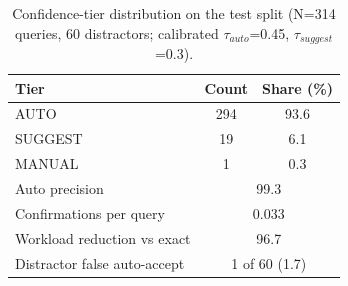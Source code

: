 \begin{table}[t]
\caption{Confidence-tier distribution on the test split (N=314 queries, 60 distractors; calibrated $\tau_{auto}$=0.45, $\tau_{suggest}$=0.3).}
\label{tab:tiers}
\centering
\footnotesize
\setlength{\tabcolsep}{3.5pt}
\begin{tabular}{lcc}
\toprule
Tier & Count & Share (\%) \\
\midrule
AUTO & 294 & 93.6 \\
SUGGEST & 19 & 6.1 \\
MANUAL & 1 & 0.3 \\
\midrule
Auto precision & \multicolumn{2}{c}{99.3} \\
Confirmations per query & \multicolumn{2}{c}{0.033} \\
Workload reduction vs exact & \multicolumn{2}{c}{96.7} \\
Distractor false auto-accept & \multicolumn{2}{c}{1 of 60 (1.7)} \\
\bottomrule
\end{tabular}
\end{table}
